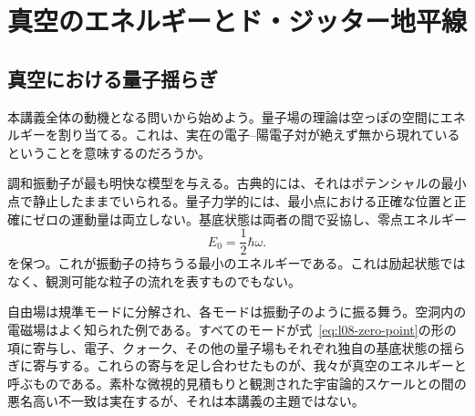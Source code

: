 \chapter{真空のエネルギーとド・ジッター地平線}


\section{真空における量子揺らぎ}

本講義全体の動機となる問いから始めよう。量子場の理論は空っぽの空間にエネルギーを割り当てる。これは、実在の電子--陽電子対が絶えず無から現れているということを意味するのだろうか。

\begin{classroomqa}
\end{classroomqa}

調和振動子が最も明快な模型を与える。古典的には、それはポテンシャルの最小点で静止したままでいられる。量子力学的には、最小点における正確な位置と正確にゼロの運動量は両立しない。基底状態は両者の間で妥協し、零点エネルギー
\begin{equation}
E_0=\frac{1}{2}\hbar\omega.
\label{eq:l08-zero-point}
\end{equation}
を保つ。これが振動子の持ちうる最小のエネルギーである。これは励起状態ではなく、観測可能な粒子の流れを表すものでもない。

自由場は規準モードに分解され、各モードは振動子のように振る舞う。空洞内の電磁場はよく知られた例である。すべてのモードが式~\eqref{eq:l08-zero-point}の形の項に寄与し、電子、クォーク、その他の量子場もそれぞれ独自の基底状態の揺らぎに寄与する。これらの寄与を足し合わせたものが、我々が真空のエネルギーと呼ぶものである。素朴な微視的見積もりと観測された宇宙論的スケールとの間の悪名高い不一致は実在するが、それは本講義の主題ではない。

